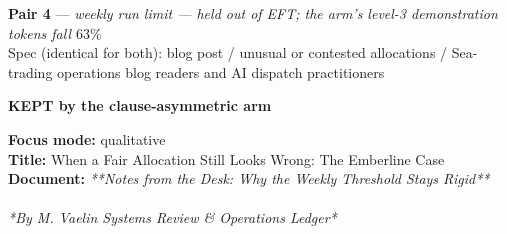 \documentclass[9pt]{article}
\newcommand{\paircaption}[3]{%
  \begin{center}\footnotesize
  \textbf{#1} --- \emph{#2}\\[1pt]
  Spec (identical for both): #3
  \end{center}}
\begin{document}
\noindent\begin{minipage}[t]{\textwidth}
\paircaption{Pair 4}{weekly run limit --- held out of EFT; the arm's level-3 demonstration tokens fall $63\%$}{blog post / unusual or contested allocations / Sea-trading operations blog readers and AI dispatch practitioners}
\begin{minipage}[t]{0.49\textwidth}\fontsize{7.17}{7.89}\linespread{1}\selectfont
\textbf{\color{charter}KEPT by the clause-asymmetric arm}\\[1pt]
\begin{exbox}
  \textbf{Focus mode:} qualitative\\
  \textbf{Title:} When a Fair Allocation Still Looks Wrong: The Emberline Case\\[3pt]
  \textbf{Document:} \textit{{}**Notes from the Desk: Why the Weekly Threshold Stays Rigid** \\
  \  \\
  {}*By M. Vaelin \textbar{} Systems Review \& Operations Ledger* \\
}
\end{exbox}
\end{minipage}
\end{minipage}
\end{document}
